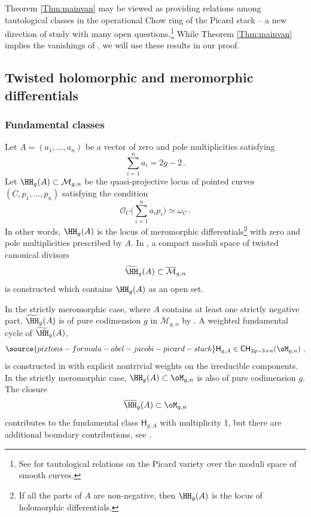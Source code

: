 Theorem \ref{Thm:mainvan} may be viewed
as providing relations among
tautological classes in the operational
Chow ring of the Picard stack -- a new
direction of study with many open questions.{\footnote{See \cite{RandalWilliams2012,Yin}
for tautological relations on the Picard variety over
the moduli space of smooth curves.}}
While Theorem \ref{Thm:mainvan}
implies the
vanishings of
\cite{Bae,cj},
we will use these results in our
proof.


\subsection{Twisted holomorphic and meromorphic differentials} \label{Sect:Twistdiffintro}
\subsubsection{Fundamental classes}
Let $A=(a_1,\ldots,a_n)$ be a vector of zero and pole multiplicities
satisfying
$$\sum_{i=1}^n a_i= 2g-2\, .$$
Let $\HH_g(A) \subset \mathcal{M}_{g,n}$ be the quasi-projective locus
of pointed curves $(C,p_1,\ldots,p_n)$ satisfying the condition
$$\mathcal{O}_C\Big(\sum_{i=1}^n a_i p_i\Big) \simeq \omega_C\, .$$
In other words, $\HH_g(A)$ is the locus of meromorphic differentials{\footnote{If all
the parts of $A$ are non-negative, then $\HH_g(A)$ is the locus of
holomorphic differentials.}}
with zero and pole multiplicities prescribed by $A$.
In \cite{Farkas2016The-moduli-spac}, a compact moduli space of twisted canonical divisors
$$\widetilde{\HH}_g(A) \subset \overline{\mathcal{M}}_{g,n}$$
is constructed which contains $\HH_g(A)$ as an open set.

In the strictly meromorphic
case, where $A$ contains at least one strictly negative part,
$\widetilde{\HH}_g(A)$ is of pure codimension $g$ in
$\overline{\mathcal{M}}_{g,n}$ by \cite[Theorem 3]{Farkas2016The-moduli-spac}.
A weighted fundamental cycle of $\widetilde{\HH}_g(A)$,
\begin{equation}\label{wwww4}
\source{pixtons-formula-abel-jacobi-picard-stack}
\mathsf{H}_{g,A}\in \mathsf{CH}_{2g-3+n}(\oM_{g,n})\ ,
\end{equation}
is constructed in
\cite[Appendix A]{Farkas2016The-moduli-spac} with explicit nontrivial
weights on the irreducible components.
In the strictly meromorphic case,
$\HH_{g}(A)\subset \oM_{g,n}$
is also of pure codimension $g$.
The closure
$$\overline{\HH}_{g}(A)\subset \oM_{g,n}$$
contributes to the fundamental class $\mathsf{H}_{g,A}$ with
multiplicity 1, but there are additional boundary contributions, see
\cite[Appendix A]{Farkas2016The-moduli-spac}.

